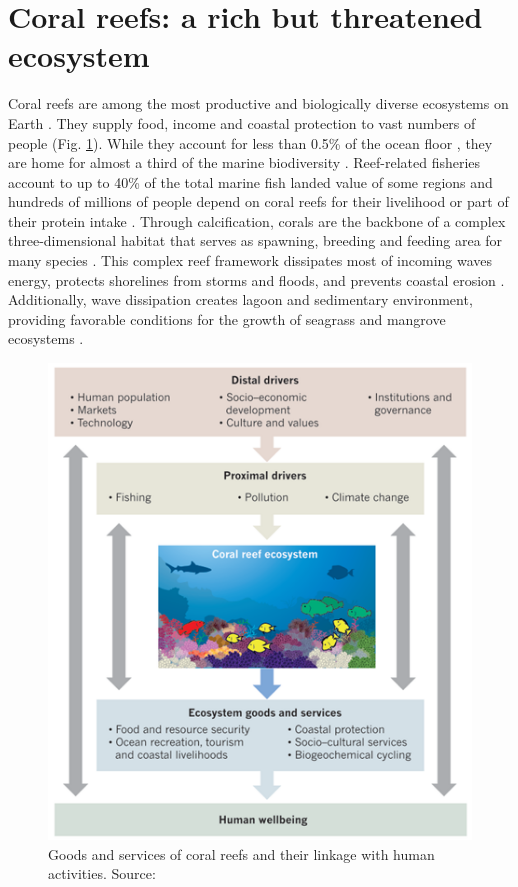 \section{Coral reefs: a rich but threatened ecosystem}

Coral reefs are among the most productive and biologically diverse ecosystems on Earth \citep{connell1978diversity, moberg1999ecological}. They supply food, income and coastal protection to vast numbers of people (Fig. \ref{intro:corals}). While they account for less than 0.5\% of the ocean floor \citep{spalding1997new}, they are home for almost a third of the marine biodiversity \citep{moberg1999ecological}. Reef-related fisheries account to up to 40\% of the total marine
fish landed value of some regions \citep{teh2013global} and hundreds of millions of people depend on coral reefs for their livelihood or part of their protein intake \citep{salvat1992coral,hoegh2019people}. Through calcification, corals are the backbone of a complex three-dimensional habitat that serves as spawning, breeding and feeding area for many species \citep{moberg1999ecological}. This complex reef framework  dissipates most of incoming waves energy, protects shorelines from storms and floods, and prevents coastal erosion \citep{ferrario2014effectiveness,elliff2017coral}. Additionally, wave dissipation creates lagoon and sedimentary environment, providing favorable conditions for the growth of seagrass and mangrove ecosystems \citep{moberg1999ecological}.

\begin{figure}
    \centering
    \includegraphics[width=.8\textwidth]{chapters/intro/figures/anthropocene.png}
    \caption{Goods and services of coral reefs and their linkage with human activities. Source: \cite{hughes2017coral}}
    \label{intro:corals}
\end{figure}

